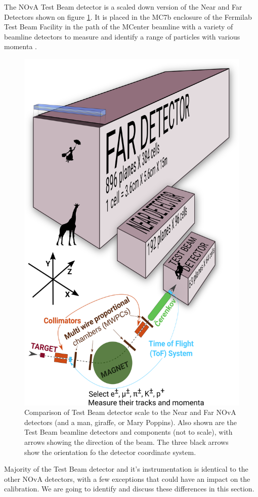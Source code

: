 \documentclass[12pt,a4paper]{article}
\begin{document}
The NOvA Test Beam detector is a scaled down version of the Near and Far Detectors shown on figure \ref{figTBDetector}. It is placed in the MC7b enclosure of the Fermilab Test Beam Facility in the path of the MCenter beamline with a variety of beamline detectors to measure and identify a range of particles with various momenta \cite{NOVA-doc-22172-v2}.

\begin{figure}[!ht]
\centering
\includegraphics[width=.7\textwidth]{Plots/TestBeamDetectorWithArrows.png}
\caption{Comparison of Test Beam detector scale to the Near and Far NOvA detectors (and a man, giraffe, or Mary Poppins). Also shown are the Test Beam beamline detectors and components (not to scale), with arrows showing the direction of the beam. The three black arrows show the orientation fo the detector coordinate system.}
\label{figTBDetector}
\end{figure}

Majority of the Test Beam detector and it's instrumentation is identical to the other NOvA detectors, with a few exceptions that could have an impact on the calibration. We are going to identify and discuss these differences in this section.
\end{document}
